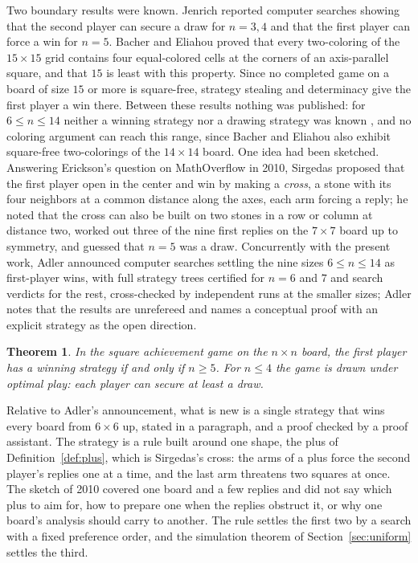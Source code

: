 \documentclass[11pt]{amsart}
\newtheorem{theorem}{Theorem}[section]
\theoremstyle{definition}
\theoremstyle{remark}
\begin{document}
Two boundary results were known. Jenrich \cite{jenrich} reported
computer searches showing that the second player can secure a draw for
$n = 3, 4$ and that the first player can force a win for $n = 5$.
Bacher and Eliahou \cite{bacher-eliahou} proved that every two-coloring
of the $15 \times 15$ grid contains four equal-colored cells at the
corners of an axis-parallel square, and that $15$ is least with this
property. Since no completed game on a board of size $15$ or more is
square-free, strategy stealing and determinacy give the first player a
win there. Between these results nothing was published: for
$6 \le n \le 14$ neither a winning strategy nor a drawing strategy was
known \cite{opg, adler}, and no coloring argument can reach this range,
since Bacher and Eliahou also exhibit square-free two-colorings of the
$14 \times 14$ board. One idea had been sketched. Answering Erickson's
question on MathOverflow in 2010, Sirgedas \cite{sirgedas} proposed
that the first player open in the center and win by making a
\emph{cross}, a stone with its four neighbors at a common distance
along the axes, each arm forcing a reply; he noted that the cross can
also be built on two stones in a row or column at distance two, worked
out three of the nine first replies on the $7 \times 7$ board up to
symmetry, and guessed that $n = 5$ was a draw. Concurrently with the
present work, Adler \cite{adler, adler-code} announced computer
searches settling the nine sizes $6 \le n \le 14$ as first-player
wins, with full strategy trees certified for $n = 6$ and $7$ and search
verdicts for the rest, cross-checked by independent runs at the smaller
sizes; Adler notes that the results are unrefereed and names a
conceptual proof with an explicit strategy as the open direction.

\begin{theorem}\label{thm:main}
In the square achievement game on the $n \times n$ board, the first
player has a winning strategy if and only if $n \ge 5$. For $n \le 4$
the game is drawn under optimal play: each player can secure at least a
draw.
\end{theorem}

Relative to Adler's announcement, what is new is a single strategy
that wins every board from $6 \times 6$ up, stated in a paragraph, and
a proof checked by a proof assistant. The strategy is a rule built
around one shape, the plus of Definition~\ref{def:plus}, which is
Sirgedas's cross: the arms of a plus force the second player's replies
one at a time, and the last arm threatens two squares at once. The
sketch of 2010 covered one board and a few replies and did not say
which plus to aim for, how to prepare one when the replies obstruct
it, or why one board's analysis should carry to another. The rule
settles the first two by a search with a fixed preference order, and
the simulation theorem of Section~\ref{sec:uniform} settles the
third.
\end{document}
